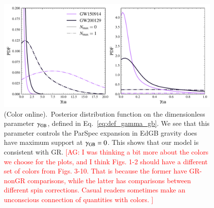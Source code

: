 \documentclass[twocolumn,
               prd,
               aps,
               superscriptaddress,
               tightenlines,
               nofootinbib,
               eqsecnum,
               amsfonts,
               amsmath,
               longbibliography]{revtex4-1}
\newcommand{\agcomm}[1]{{\textcolor{red}{{[AG: #1]}} }}
\begin{document}
\begin{figure}[h]
\includegraphics[width=\columnwidth]{figs/edgb_gamma.pdf}
\caption{(Color online).~Posterior distribution function on the dimensionless parameter $\gamma_{\rm GB}$,
defined in Eq.~\eqref{eq:def_gamma_gb}. We see that this parameter controls the ParSpec expansion in EdGB gravity
does have maximum support at $\gamma_{\rm GB} = 0$. This shows that our model is consistent with GR.
\agcomm{I was thinking a bit more about the colors we choose for the plots, and I think Figs. 1-2 should have a different set of colors from Figs. 3-10. That is because the former have GR-nonGR comparisons, while the latter has comparisons between different spin corrections. Casual readers sometimes make an unconscious connection of quantities with colors. }}
\label{fig:gamma_gb}
\end{figure}
\end{document}
